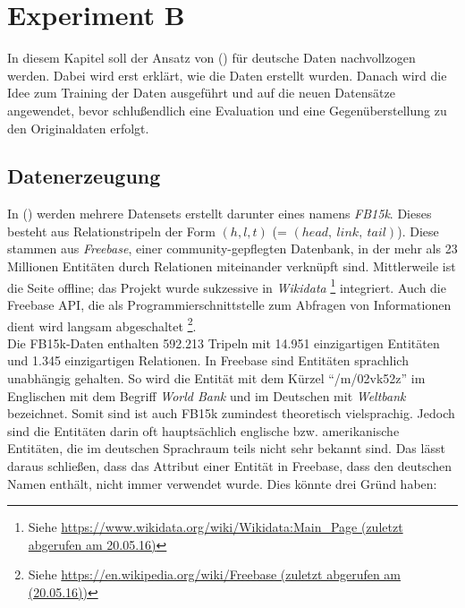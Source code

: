 
\chapter{Experiment B} %

\label{Chapter7} %


In diesem Kapitel soll der Ansatz von (\cite{bordes2013translating}) für deutsche Daten nachvollzogen werden.
Dabei wird erst erklärt, wie die Daten erstellt wurden. Danach wird die Idee zum Training der Daten ausgeführt und
auf die neuen Datensätze angewendet, bevor schlußendlich eine Evaluation und eine Gegenüberstellung zu den Originaldaten
erfolgt.

\section{Datenerzeugung}

In (\cite{bordes2013translating}) werden mehrere Datensets erstellt darunter eines namens \emph{FB15k}. Dieses
besteht aus Relationstripeln der Form $(h, l, t)$
(= $(head,\ link,\ tail)$). Diese stammen aus \emph{Freebase}, einer
community-gepflegten Datenbank, in der mehr als 23 Millionen Entitäten durch Relationen miteinander verknüpft sind.
Mittlerweile ist die Seite offline; das Projekt wurde sukzessive in \emph{Wikidata}
\footnote{Siehe \url{https://www.wikidata.org/wiki/Wikidata:Main_Page (zuletzt abgerufen am 20.05.16)}} integriert. Auch die
Freebase API, die als Programmierschnittstelle zum Abfragen von Informationen dient wird langsam abgeschaltet
\footnote{Siehe \url{https://en.wikipedia.org/wiki/Freebase (zuletzt abgerufen am (20.05.16))}}.\\

Die FB15k-Daten enthalten 592.213 Tripeln mit 14.951 einzigartigen Entitäten und 1.345 einzigartigen Relationen.
In Freebase sind Entitäten sprachlich unabhängig gehalten. So wird die Entität mit dem Kürzel ``/m/02vk52z''
im Englischen mit dem Begriff \emph{World Bank} und im Deutschen mit \emph{Weltbank} bezeichnet. Somit sind ist auch
FB15k zumindest theoretisch vielsprachig. Jedoch sind die Entitäten darin oft hauptsächlich englische bzw. amerikanische
Entitäten, die im deutschen Sprachraum teils nicht sehr bekannt sind. Das lässt daraus schließen, dass das Attribut einer
Entität in Freebase, dass den deutschen Namen enthält, nicht immer verwendet wurde. Dies könnte drei Gründ haben:

